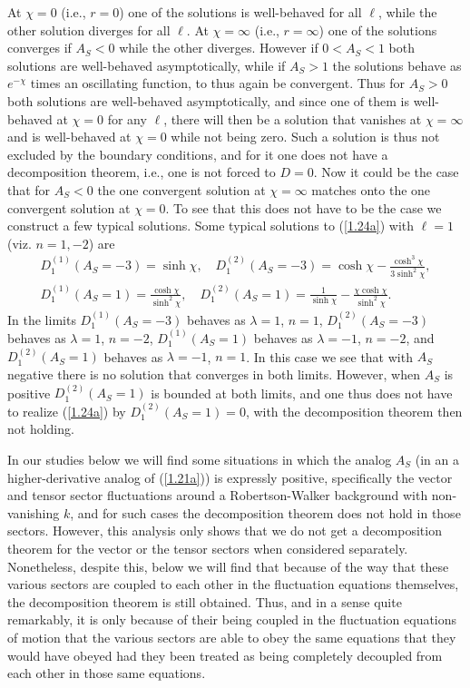 \documentclass[aps,onecolumn,10pt]{revtex4}
\numberwithin{equation}{section}
\numberwithin{equation}{section}
\begin{document}
%
At $\chi=0$ (i.e., $r=0$) one of the solutions is well-behaved for all $\ell$, while the other solution diverges for all $\ell$. At $\chi=\infty$ (i.e., $r=\infty$) one of the solutions converges if $A_S<0$ while the other diverges. However if $0<A_S<1$ both solutions are well-behaved asymptotically, while if $A_S>1$ the solutions behave as $e^{-\chi}$ times an oscillating function, to thus again be convergent. Thus for $A_S>0$ both solutions are well-behaved asymptotically, and since one of them is well-behaved at $\chi=0$ for any $\ell$, there will then be a solution that vanishes at $\chi=\infty$ and is well-behaved at $\chi=0$ while not being zero. Such a solution is thus not excluded by the boundary conditions, and for it one does not have a decomposition theorem, i.e., one is not forced to $D=0$. Now it could be the case that for $A_S<0$ the one convergent solution at $\chi=\infty$ matches onto the one convergent solution at $\chi=0$. To see that this does not have to be the case we construct a few typical solutions. Some typical solutions to (\ref{1.24a}) with $\ell=1$ (viz. $n=1,-2$) are
%
\begin{eqnarray}
D^{(1)}_1(A_S=-3)=\sinh\chi,\quad D^{(2)}_1(A_S=-3)=\cosh\chi-\frac{\cosh^3\chi}{3\sinh^2\chi},
\nonumber\\
D^{(1)}_1(A_S=1)=\frac{\cosh \chi}{\sinh^2\chi},\quad D^{(2)}_1(A_S=1)=\frac{1}{\sinh\chi}-\frac{\chi\cosh\chi}{\sinh^2\chi}.
\label{1.26a}
\end{eqnarray}
%
In the limits $D^{(1)}_1(A_S=-3)$ behaves as $\lambda=1$, $n=1$, $D^{(2)}_1(A_S=-3)$ behaves as $\lambda=1$, $n=-2$, $D^{(1)}_1(A_S=1)$ behaves as $\lambda=-1$, $n=-2$, and $D^{(2)}_1(A_S=1)$ behaves as $\lambda=-1$, $n=1$. In this case we see that with $A_S$ negative there is no solution that converges in both limits. However, when $A_S$ is positive $D^{(2)}_1(A_S=1)$ is bounded at both limits, and one thus does not have to realize (\ref{1.24a}) by $D^{(2)}_1(A_S=1)=0$, with the decomposition theorem then not holding. 

In our studies below we will find some situations in which the analog $A_S$ (in an a higher-derivative analog of (\ref{1.21a})) is expressly positive, specifically the vector and tensor sector fluctuations around a Robertson-Walker background with non-vanishing $k$, and for such cases the decomposition theorem does not hold in those sectors. However, this analysis only shows that we do not get a decomposition theorem for the vector or the tensor sectors when considered separately. Nonetheless, despite this, below we will find that because of the way that these various sectors are coupled to each other in the fluctuation equations themselves, the decomposition theorem is still obtained. Thus, and in a sense quite remarkably, it is only because of their being coupled in the fluctuation equations of motion that the various sectors are able to obey the same equations that they would have obeyed had they been treated as being completely decoupled from each other in those same equations.
\end{document}
